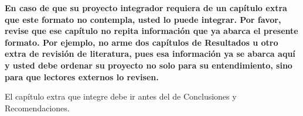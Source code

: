 \documentclass[12pt,oneside]{report}
\makeatletter
\newcommand{\encabezado}{\@ifstar{\@encabezadoS}{\@encabezadoN}}
\newcommand{\@encabezadoN}[1]{%
  \phantomsection\addcontentsline{toc}{chapter}{#1}%
  {\centering\bfseries #1\par}}
\newcommand{\@encabezadoS}[1]{{\centering\bfseries #1\par}}
\makeatother
\begin{document}
\bigskip
{\color{red}\bfseries
En caso de que su proyecto integrador requiera de un capítulo extra que este formato no contempla, usted lo puede integrar. Por favor, revise que ese capítulo no repita información que ya abarca el presente formato. Por ejemplo, no arme dos capítulos de Resultados u otro extra de revisión de literatura, pues esa información ya se abarca aquí y usted debe ordenar su proyecto no solo para su entendimiento, sino para que lectores externos lo revisen.

El capítulo extra que integre debe ir antes del de Conclusiones y Recomendaciones.\par}

\clearpage
\pagestyle{empty}
\encabezado{Referencias}
\end{document}
